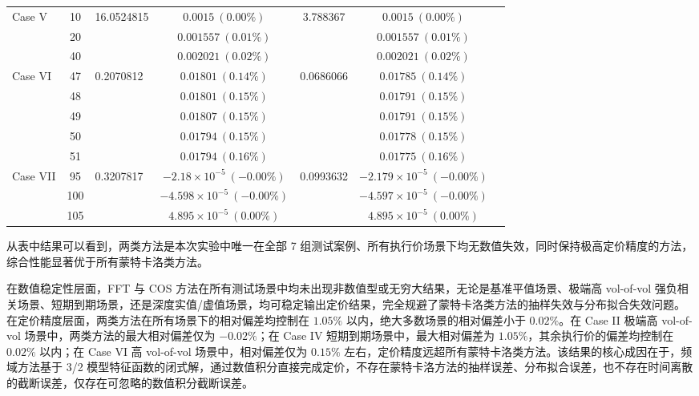 \begin{table}[htbp]
{\begin{tabular}{lclcccc}
    \midrule
    \multirow{3}{*}{Case V}
    & 10 & \multirow{3}{*}{16.0524815} & $0.0015\ (0.00\%)$ & \multirow{3}{*}{3.788367} & $0.0015\ (0.00\%)$ \\
    & 20 & & $0.001557\ (0.01\%)$ & & $0.001557\ (0.01\%)$ \\
    & 40 & & $0.002021\ (0.02\%)$ & & $0.002021\ (0.02\%)$ \\
    \midrule
    \multirow{5}{*}{Case VI}
    & 47 & \multirow{5}{*}{0.2070812} & $0.01801\ (0.14\%)$ & \multirow{5}{*}{0.0686066} & $0.01785\ (0.14\%)$ \\
    & 48 & & $0.01801\ (0.15\%)$ & & $0.01791\ (0.15\%)$ \\
    & 49 & & $0.01807\ (0.15\%)$ & & $0.01791\ (0.15\%)$ \\
    & 50 & & $0.01794\ (0.15\%)$ & & $0.01778\ (0.15\%)$ \\
    & 51 & & $0.01794\ (0.16\%)$ & & $0.01775\ (0.16\%)$ \\
    \midrule
    \multirow{3}{*}{Case VII}
    & 95 & \multirow{3}{*}{0.3207817} & $-2.18\times10^{-5}\ (-0.00\%)$ & \multirow{3}{*}{0.0993632} & $-2.179\times10^{-5}\ (-0.00\%)$ \\
    & 100 & & $-4.598\times10^{-5}\ (-0.00\%)$ & & $-4.597\times10^{-5}\ (-0.00\%)$ \\
    & 105 & & $4.895\times10^{-5}\ (0.00\%)$ & & $4.895\times10^{-5}\ (0.00\%)$ \\
    \bottomrule
  \end{tabular}%
  }
\end{table}

从表中结果可以看到，两类方法是本次实验中唯一在全部 7 组测试案例、所有执行价场景下均无数值失效，同时保持极高定价精度的方法，综合性能显著优于所有蒙特卡洛类方法。

在数值稳定性层面，FFT 与 COS 方法在所有测试场景中均未出现非数值型或无穷大结果，无论是基准平值场景、极端高 vol-of-vol 强负相关场景、短期到期场景，还是深度实值/虚值场景，均可稳定输出定价结果，完全规避了蒙特卡洛类方法的抽样失效与分布拟合失效问题。在定价精度层面，两类方法在所有场景下的相对偏差均控制在 $1.05\%$ 以内，绝大多数场景的相对偏差小于 $0.02\%$。在 Case II 极端高 vol-of-vol 场景中，两类方法的最大相对偏差仅为 $-0.02\%$；在 Case IV 短期到期场景中，最大相对偏差为 $1.05\%$，其余执行价的偏差均控制在 $0.02\%$ 以内；在 Case VI 高 vol-of-vol 场景中，相对偏差仅为 $0.15\%$ 左右，定价精度远超所有蒙特卡洛类方法。该结果的核心成因在于，频域方法基于 3/2 模型特征函数的闭式解，通过数值积分直接完成定价，不存在蒙特卡洛方法的抽样误差、分布拟合误差，也不存在时间离散的截断误差，仅存在可忽略的数值积分截断误差。

